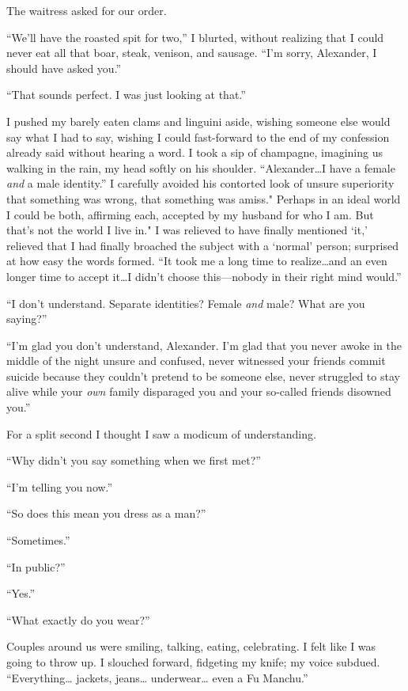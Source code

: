 The waitress asked for our order.

``We'll have the roasted spit for two,'' I blurted, without realizing
that I could never eat all that boar, steak, venison, and sausage. ``I'm
sorry, Alexander, I should have asked you.''

``That sounds perfect. I was just looking at that.''

I pushed my barely eaten clams and linguini aside, wishing someone else
would say what I had to say, wishing I could fast-forward to the end of
my confession already said without hearing a word. I took a sip of
champagne, imagining us walking in the rain, my head softly on his
shoulder. ``Alexander\ldots I have a female \emph{and} a male
identity.'' I carefully avoided his contorted look of unsure superiority
that something was wrong, that something was amiss." Perhaps in an ideal
world I could be both, affirming each, accepted by my husband for who I
am. But that's not the world I live in." I was relieved to have finally
mentioned `it,' relieved that I had finally broached the subject with a
`normal' person; surprised at how easy the words formed. ``It took me a
long time to realize\ldots and an even longer time to accept it\ldots I
didn't choose this---nobody in their right mind would.''

``I don't understand. Separate identities? Female \emph{and} male? What
are you saying?''

``I'm glad you don't understand, Alexander. I'm glad that you never
awoke in the middle of the night unsure and confused, never witnessed
your friends commit suicide because they couldn't pretend to be someone
else, never struggled to stay alive while your \emph{own} family
disparaged you and your so-called friends disowned you.''

For a split second I thought I saw a modicum of understanding.

``Why didn't you say something when we first met?''

``I'm telling you now.''

``So does this mean you dress as a man?''

``Sometimes.''

``In public?''

``Yes.''

``What exactly do you wear?''

Couples around us were smiling, talking, eating, celebrating. I felt
like I was going to throw up. I slouched forward, fidgeting my knife; my
voice subdued. ``Everything\ldots{} jackets, jeans\ldots{}
underwear\ldots{} even a Fu Manchu.''

